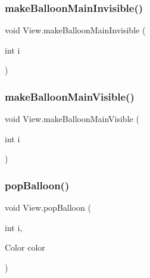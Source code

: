 \subsubsection{\texorpdfstring{make\+Balloon\+Main\+Invisible()}{makeBalloonMainInvisible()}}
{\footnotesize\ttfamily void View.\+make\+Balloon\+Main\+Invisible (\begin{DoxyParamCaption}\item[{int}]{i }\end{DoxyParamCaption})\hspace{0.3cm}{\ttfamily [inline]}}

\mbox{\label{classView_a34ea9f566a24a298d6848c497438ca9d}} 
\subsubsection{\texorpdfstring{make\+Balloon\+Main\+Visible()}{makeBalloonMainVisible()}}
{\footnotesize\ttfamily void View.\+make\+Balloon\+Main\+Visible (\begin{DoxyParamCaption}\item[{int}]{i }\end{DoxyParamCaption})\hspace{0.3cm}{\ttfamily [inline]}}

\mbox{\label{classView_a7b8dc6ece898af6cce44d1b48e1d1ccd}} 
\subsubsection{\texorpdfstring{pop\+Balloon()}{popBalloon()}}
{\footnotesize\ttfamily void View.\+pop\+Balloon (\begin{DoxyParamCaption}\item[{int}]{i,  }\item[{Color}]{color }\end{DoxyParamCaption})\hspace{0.3cm}{\ttfamily [inline]}}

\mbox{\label{classView_a1ce5325961058c28aeb0d31cf8e8dfa1}} 
